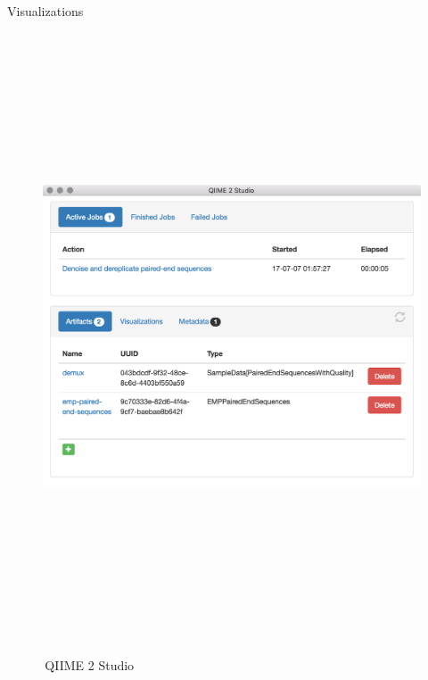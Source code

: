 \documentclass[final]{beamer}
\newlength{\colwidth}
\begin{document}
\begin{frame}[t]
\begin{columns}[t]
\begin{column}{\colwidth}
\begin{block}{Visualizations}
    \begin{figure}[tph!]
      {\includegraphics[height=18cm]{assets/q2studio}}
      \caption{\,QIIME 2 Studio}
      \label{fig:q2studio}
    \end{figure}
  \end{block}


\end{column}
\end{columns}
\end{frame}
\end{document}
